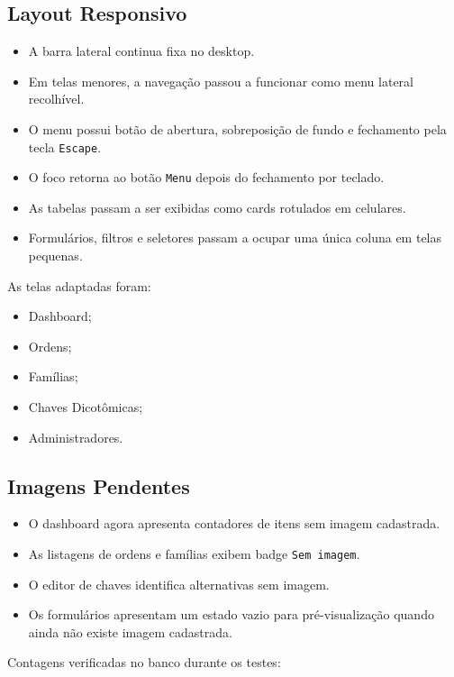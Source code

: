 \documentclass[12pt,a4paper]{article}
\begin{document}
\subsection{Layout Responsivo}

\begin{itemize}
  \item A barra lateral continua fixa no desktop.
  \item Em telas menores, a navegação passou a funcionar como menu lateral recolhível.
  \item O menu possui botão de abertura, sobreposição de fundo e fechamento pela tecla \texttt{Escape}.
  \item O foco retorna ao botão \texttt{Menu} depois do fechamento por teclado.
  \item As tabelas passam a ser exibidas como cards rotulados em celulares.
  \item Formulários, filtros e seletores passam a ocupar uma única coluna em telas pequenas.
\end{itemize}

As telas adaptadas foram:

\begin{itemize}
  \item Dashboard;
  \item Ordens;
  \item Famílias;
  \item Chaves Dicotômicas;
  \item Administradores.
\end{itemize}

\subsection{Imagens Pendentes}

\begin{itemize}
  \item O dashboard agora apresenta contadores de itens sem imagem cadastrada.
  \item As listagens de ordens e famílias exibem badge \texttt{Sem imagem}.
  \item O editor de chaves identifica alternativas sem imagem.
  \item Os formulários apresentam um estado vazio para pré-visualização quando ainda não existe imagem cadastrada.
\end{itemize}

Contagens verificadas no banco durante os testes:
\end{document}
